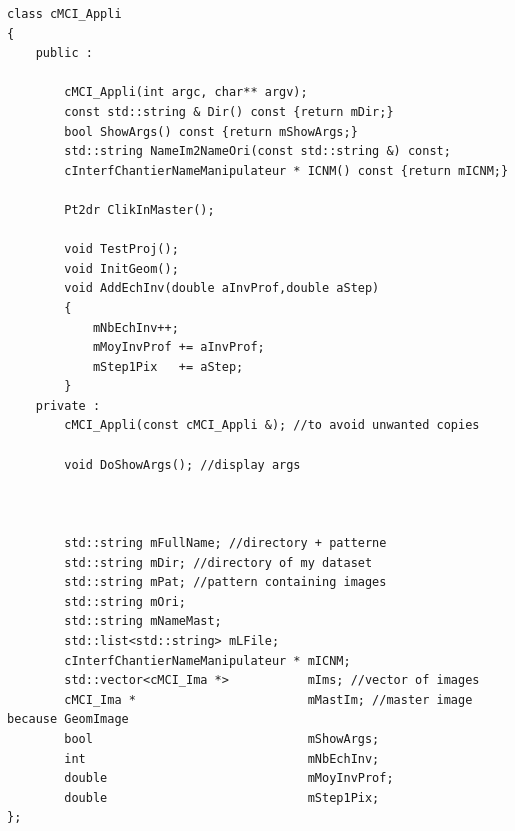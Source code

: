 \begin{verbatim}
class cMCI_Appli
{
    public :

        cMCI_Appli(int argc, char** argv);
        const std::string & Dir() const {return mDir;}
        bool ShowArgs() const {return mShowArgs;}
        std::string NameIm2NameOri(const std::string &) const;
        cInterfChantierNameManipulateur * ICNM() const {return mICNM;}

        Pt2dr ClikInMaster();

        void TestProj();
        void InitGeom();
        void AddEchInv(double aInvProf,double aStep)
        {
            mNbEchInv++;
            mMoyInvProf += aInvProf;
            mStep1Pix   += aStep;
        }
    private :
        cMCI_Appli(const cMCI_Appli &); //to avoid unwanted copies

        void DoShowArgs(); //display args



        std::string mFullName; //directory + patterne
        std::string mDir; //directory of my dataset
        std::string mPat; //pattern containing images
        std::string mOri;
        std::string mNameMast;
        std::list<std::string> mLFile;
        cInterfChantierNameManipulateur * mICNM;
        std::vector<cMCI_Ima *>           mIms; //vector of images
        cMCI_Ima *                        mMastIm; //master image because GeomImage
        bool                              mShowArgs;
        int                               mNbEchInv;
        double                            mMoyInvProf;
        double                            mStep1Pix;
};
\end{verbatim}

